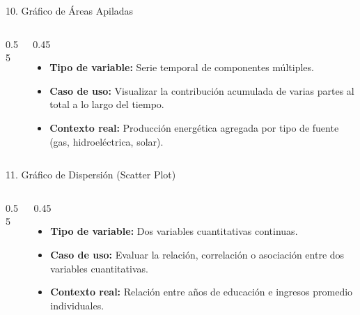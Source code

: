 \documentclass[aspectratio=169,10pt]{beamer}
\begin{document}
\begin{frame}{10. Gráfico de Áreas Apiladas}
\begin{columns}
\begin{column}{0.55\textwidth}
\end{column}
\begin{column}{0.45\textwidth}
\begin{itemize}\small
\item \textbf{Tipo de variable:} Serie temporal de componentes múltiples.
\item \textbf{Caso de uso:} Visualizar la contribución acumulada de varias partes al total a lo largo del tiempo.
\item \textbf{Contexto real:} Producción energética agregada por tipo de fuente (gas, hidroeléctrica, solar).
\end{itemize}
\end{column}
\end{columns}
\end{frame}

\begin{frame}{11. Gráfico de Dispersión (Scatter Plot)}
\begin{columns}
\begin{column}{0.55\textwidth}
\end{column}
\begin{column}{0.45\textwidth}
\begin{itemize}\small
\item \textbf{Tipo de variable:} Dos variables cuantitativas continuas.
\item \textbf{Caso de uso:} Evaluar la relación, correlación o asociación entre dos variables cuantitativas.
\item \textbf{Contexto real:} Relación entre años de educación e ingresos promedio individuales.
\end{itemize}
\end{column}
\end{columns}
\end{frame}
\end{document}
